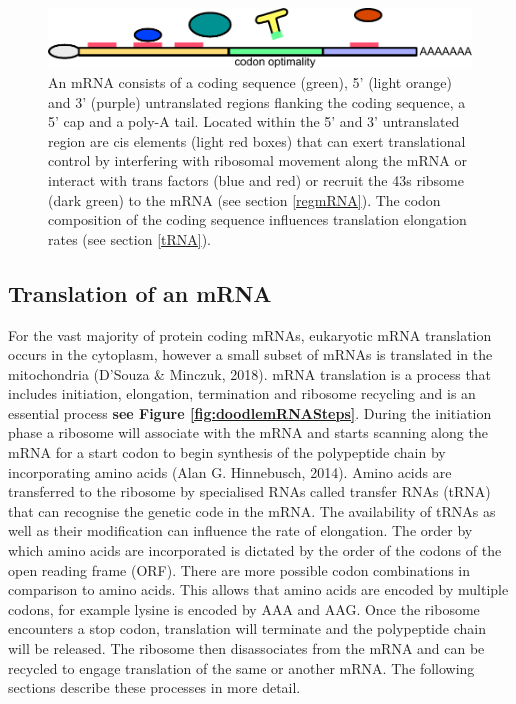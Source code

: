 \documentclass[
  12pt,
  openany]{book}
\begin{document}
\begin{figure}
  \includegraphics{./figures/UTRFeatures.pdf}
  \caption{ An mRNA consists of a coding sequence (green), 5' (light orange) and 3' (purple) untranslated regions flanking the coding sequence, a 5' cap and a poly-A tail. Located within the 5' and 3' untranslated region are cis elements (light red boxes) that can exert translational control by interfering with ribosomal movement along the mRNA or interact with trans factors (blue and red) or recruit the 43s ribsome (dark green) to the mRNA (see section \ref{regmRNA}). The codon composition of the coding sequence influences translation elongation rates (see section \ref{tRNA}).   
 \label{fig:UTRFeat}}
\end{figure}
\clearpage
\subsection{Translation of an mRNA}

For the vast majority of protein coding mRNAs, eukaryotic mRNA translation occurs in the cytoplasm, however a small subset of mRNAs is translated in the mitochondria (D'Souza \& Minczuk, 2018). mRNA translation is a process that includes initiation, elongation, termination and ribosome recycling and is an essential process \textbf{see Figure \ref{fig:doodlemRNASteps}}. During the initiation phase a ribosome will associate with the mRNA and starts scanning along the mRNA for a start codon to begin synthesis of the polypeptide chain by incorporating amino acids (Alan G. Hinnebusch, 2014). Amino acids are transferred to the ribosome by specialised RNAs called transfer RNAs (tRNA) that can recognise the genetic code in the mRNA. The availability of tRNAs as well as their modification can influence the rate of elongation. The order by which amino acids are incorporated is dictated by the order of the codons of the open reading frame (ORF). There are more possible codon combinations in comparison to amino acids. This allows that amino acids are encoded by multiple codons, for example lysine is encoded by AAA and AAG. Once the ribosome encounters a stop codon, translation will terminate and the polypeptide chain will be released. The ribosome then disassociates from the mRNA and can be recycled to engage translation of the same or another mRNA. The following sections describe these processes in more detail.
\end{document}
